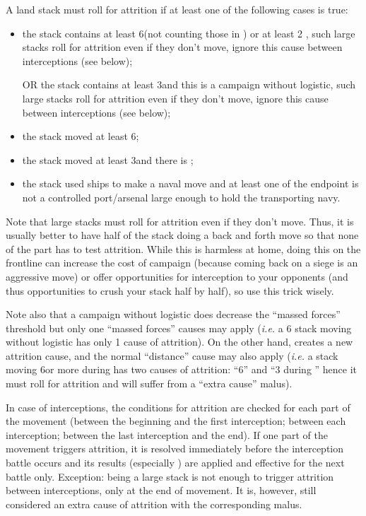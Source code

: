 A land stack must roll for attrition if at least one of the following cases is
true:
\begin{itemize}
\item the stack contains at least 6\LD (not counting those in \Pasha) or at
  least 2 \Pashas, such large stacks roll for attrition even if they don't
  move, ignore this cause between interceptions (see below);
\item[OR] the stack contains at least 3\LD and this is a campaign without
  logistic, such large stacks roll for attrition even if they don't move,
  ignore this cause between interceptions (see below);
\item the stack moved at least 6\MP;
\item the stack moved at least 3\MP and there is ;
\item the stack used ships to make a naval move and at least one of the
  endpoint is not a controlled port/arsenal large enough to hold the
  transporting navy.
\end{itemize}

Note that large stacks must roll for attrition even if they don't move. Thus,
it is usually better to have half of the stack doing a back and forth move so
that none of the part has to test attrition. While this is harmless at home,
doing this on the frontline can increase the cost of campaign (because coming
back on a siege is an aggressive move) or offer opportunities for interception
to your opponents (and thus opportunities to crush your stack half by half),
so use this trick wisely.

Note also that a campaign without logistic does decrease the ``massed forces''
threshold but only one ``massed forces'' causes may apply (\emph{i.e.} a 6\LD
stack moving without logistic has only 1 cause of attrition). On the other
hand,  creates a new attrition cause, and the normal
``distance'' cause may also apply (\emph{i.e.} a stack moving 6\MP or more
during  has two causes of attrition: ``6\MP'' and ``3\MP
during '' hence it must roll for attrition and will suffer
from a ``extra cause'' malus).

In case of interceptions, the conditions for attrition are checked for each
part of the movement (between the beginning and the first interception;
between each interception; between the last interception and the end). If one
part of the movement triggers attrition, it is resolved immediately before the
interception battle occurs and its results (especially ) are
applied and effective for the next battle only. Exception: being a large stack
is not enough to trigger attrition between interceptions, only at the end of
movement. It is, however, still considered an extra cause of attrition with
the corresponding malus.

